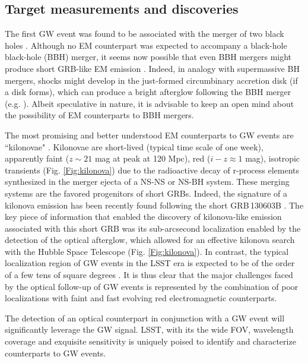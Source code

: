 
\subsection{Target measurements and discoveries}
\label{sec:\secname:targets}

The first GW event was found to be associated with the merger of two black holes \citep{Abbott16,Abbott16b}. Although no EM counterpart was expected to accompany a black-hole black-hole (BBH) merger, it seems now possible that even BBH mergers  might produce short GRB-like EM emission \citep{Connaughton16, Loeb16,Zhang16,Perna16,Stone16}. Indeed, in analogy with supermassive BH mergers, shocks might develop in the just-formed circumbinary accretion disk (if a disk forms), which can produce a bright afterglow following the BBH merger (e.g. \citealt{Lippai08,Corrales10,Schnittman13}). Albeit speculative in nature, it is advisable to keep an open mind about the possibility of EM counterparts to BBH mergers. 

The most promising and better understood EM counterparts to GW events are ``kilonovae" \citep{Li98, Metzger10, Metzger12,Kasen13,Barnes13}. Kilonovae are short-lived (typical time scale of one week), apparently faint ($z\sim21$ mag at peak at 120 Mpc), red ($i-z\approx1$ mag), isotropic transients (Fig. \ref{Fig:kilonova}) due to the radioactive decay of r-process elements synthesized in the merger ejecta of a NS-NS or NS-BH system. These merging systems are the favored progenitors of short GRBs. Indeed, the signature of a kilonova emission has been recently found following the short GRB\,130603B \citep{Berger13,Tanvir13}. The key piece of information that enabled the discovery of kilonova-like emission associated with  this short GRB was its sub-arcsecond localization enabled by the detection of the optical afterglow, which allowed for an effective kilonova search with the Hubble Space Telescope (Fig. \ref{Fig:kilonova}). In contrast, the typical localization region of GW events in the LSST era is expected to be of the order of a few tens of square degrees \citep{aaa+13}. It is thus clear that the major challenges faced by the optical follow-up of GW events is represented by the combination of poor localizations with faint and fast evolving red electromagnetic counterparts.

The detection of an optical counterpart in conjunction with a GW event will significantly leverage the GW signal.
LSST, with its the wide FOV, wavelength coverage and exquisite sensitivity is uniquely poised to identify and characterize counterparts to GW events. 


